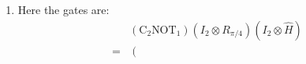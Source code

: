 \documentclass[12pt,a4]{article}
\begin{document}
\begin{enumerate}
\begin{enumerate}
\begin{align*}
\begin{matrix}
            \end{matrix}
          \right)
          \left(
            \begin{matrix}
              1 & 0 & 0 & 0\\
              0 & 1 & 0 & 0\\
              0 & 0 & 0 & 1\\
              0 & 0 & 1 & 0
            \end{matrix}
          \right)
          \left(
            \begin{matrix}
              1 & 0 & 0 & 0\\
              0 & 0 & 0 & 1\\
              0 & 0 & 1 & 0\\
              0 & 1 & 0 & 0
            \end{matrix}
          \right)\\
          =&
          \left(
            \begin{matrix}
              1 & 0 & 0 & 0\\
              0 & 0 & 0 & 1\\
              0 & 0 & 1 & 0\\
              0 & 1 & 0 & 0
            \end{matrix}
          \right)
          \left(
            \begin{matrix}
              1 & 0 & 0 & 0\\
              0 & 0 & 0 & 1\\
              0 & 1 & 0 & 0\\
              0 & 0 & 1 & 0
            \end{matrix}
          \right)\\
          =&
          \left(
            \begin{matrix}
              1 & 0 & 0 & 0\\
              0 & 0 & 1 & 0\\
              0 & 1 & 0 & 0\\
              0 & 0 & 0 & 1
            \end{matrix}
          \right)
        \end{align*}
      \item
        Here the gates are:
        \begin{align*}
            & (\text{C}_2\text{NOT}_1)(I_2 \otimes R_{\pi / 4})(I_2 \otimes \hat H)\\
          = &
          \left(
            \begin{matrix}

\end{matrix}
\end{align*}
\end{enumerate}
\end{enumerate}
\end{document}
